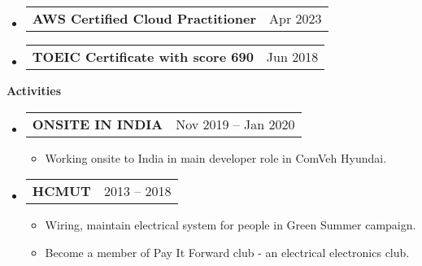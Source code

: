 \documentclass[letterpaper,12pt]{article}[leftmargin=*]
\makeatletter
\def \entryspacing {5pt}
\renewcommand{\section}[2]{\vspace{5pt}
  \colorbox{secondary}{\color{white}\raggedbottom\normalsize\textbf{{#1}{\hspace{7pt}#2}}}
}
\newcommand{\resumeEntryStart}{\begin{itemize}[leftmargin=2.5mm]}
\newcommand{\resumeEntryEnd}{\end{itemize}\vspace{\entryspacing}}
\newcommand{\resumeItemListStart}{\begin{itemize}[leftmargin=4.5mm]}
\newcommand{\resumeItemListEnd}{\end{itemize}}
\newcommand{\resumeItem}[1]{
  \item\small{
    {#1 \vspace{-2pt}}
  }
}
\newcommand{\resumeEntryTD}[2]{
  \vspace{1pt}\item[]
    \begin{tabularx}{0.97\textwidth}{X@{\hspace{60pt}}r}
      \textbf{\color{primary}#1} & {\firabook\color{accent}\small#2} \\
    \end{tabularx}\vspace{-6pt}
}
\makeatother
\begin{document}
  \resumeEntryStart
    \resumeEntryTD
      {AWS Certified Cloud Practitioner}{Apr 2023}
  \resumeEntryEnd
  \vspace{-20pt}
  
  \resumeEntryStart
    \resumeEntryTD
      {TOEIC Certificate with score 690}{Jun 2018}
  \resumeEntryEnd

\section{\faWalking}{Activities}
  \resumeEntryStart
    \resumeEntryTD
      {ONSITE IN INDIA}{Nov 2019 -- Jan 2020}
    \resumeItemListStart
      \resumeItem {Working onsite to India in main developer role in ComVeh Hyundai.}
    \resumeItemListEnd
  \resumeEntryEnd
  \vspace{-20pt}
  
  \resumeEntryStart
    \resumeEntryTD
      {HCMUT}{2013 -- 2018}
    \resumeItemListStart
      \resumeItem {Wiring, maintain electrical system for people in Green Summer campaign.}
      \resumeItem {Become a member of Pay It Forward club - an electrical electronics club.}
    \resumeItemListEnd
  \resumeEntryEnd
\end{document}
